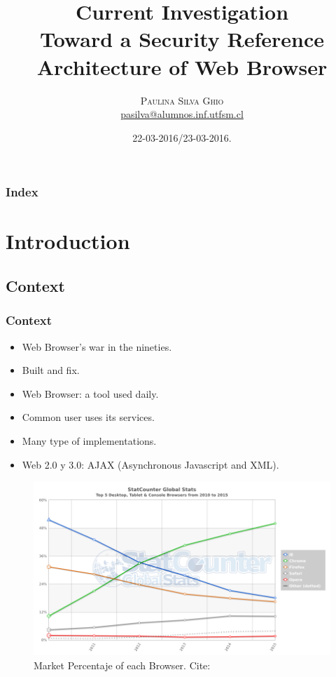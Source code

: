 \documentclass[serif,9pt]{beamer}
\begin{document}
\title{Current Investigation\\ Toward a Security Reference Architecture of Web Browser} 
\author[Paulina Silva Ghio]{\textsc{Paulina Silva Ghio} \\ \medskip
\small{}
\medskip
\url{pasilva@alumnos.inf.utfsm.cl}}
\institute[]{}
\date{22-03-2016/23-03-2016.}

\begin{frame}[plain]
\titlepage
\end{frame}


\begin{frame}
\frametitle{Index}
\tableofcontents
\end{frame} 


\section{Introduction}
\subsection{Context}
\begin{frame}
	\frametitle{Context}

	\begin{itemize}
		\item Web Browser's war in the nineties. 
		\item Built and fix.
		\item Web Browser: a tool used daily.
		\item Common user uses its services.
		\item Many type of implementations.
		\item Web 2.0 y 3.0: AJAX (Asynchronous Javascript and XML).
	\end{itemize}
	\begin{figure}[h]
	    \centering
	    \includegraphics[scale=0.3]{figures/StatCounter-browser-ww-yearly-2010-2015.png}
	    \caption{Market Percentaje of each Browser. Cite: \cite{statBrow}}
	    \label{fig:UsageShare}
	\end{figure}
\end{frame}
\end{document}
